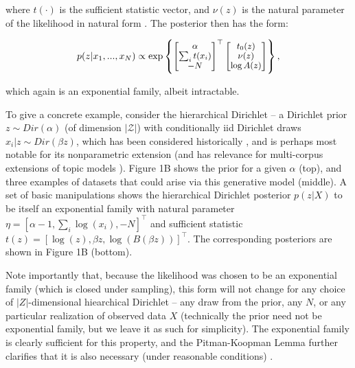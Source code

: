 \documentclass[twoside]{article}
\begin{document}
where $t(\cdot)$ is the sufficient statistic vector, and $\nu(z)$ is the natural parameter of the likelihood in natural form \citep{robert2007bayesian}.   The posterior then has the form:

\begin{equation}
{\small
  p(z | x_1,...,x_N)  \propto  \exp\left\{ \begin{bmatrix} \alpha \\ \sum_i t(x_i) \\ -N \end{bmatrix}^\top\begin{bmatrix} t_0(z) \\ \nu(z) \\ \log A(z) \end{bmatrix} \right\},
  }
\label{eq:3}
\end{equation}

which again is an exponential family, albeit intractable.

To give a concrete example, consider the hierarchical Dirichlet -- a Dirichlet prior $z\sim Dir(\alpha)$ (of dimension $|\mathcal{Z}|$) with conditionally iid Dirichlet draws $x_i | z \sim Dir(\beta z)$, which has been considered historically \citep{mackay1995hierarchical}, and is perhaps most notable for its nonparametric extension \citep{teh2006hdp} (and has relevance for multi-corpus extensions of topic models \citep{blei2003latent, pritchard2000inference}).  
Figure 1B shows the prior for a given $\alpha$ (top), and three examples of datasets that could arise via this generative model (middle).  
A set of basic manipulations shows the hierarchical Dirichlet posterior $p(z|X)$ to be itself an exponential family with natural parameter $\eta = \left[ \alpha -1 , \sum_i \log(x_i) , -N \right]^\top$ and sufficient statistic $t(z) = \left[ \log(z), \beta z , \log(B(\beta z)) \right]^\top$.%
The corresponding posteriors are shown in Figure 1B (bottom).  

Note importantly that, because the likelihood was chosen to be an exponential family (which is closed under sampling), this form will not change for any choice of $|Z|$-dimensional hiearchical Dirichlet -- any draw from the prior, any $N$, or any particular realization of observed data $X$ (technically the prior need not be exponential family, but we leave it as such for simplicity).  
The exponential family is clearly sufficient for this property, and the Pitman-Koopman Lemma further clarifies that it is also necessary (under reasonable conditions) \citep[\S3.3.3]{robert2007bayesian}.
\end{document}
